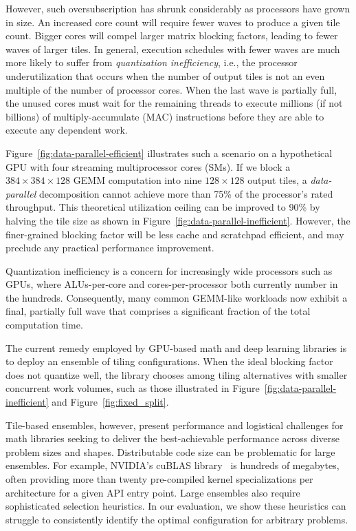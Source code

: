 However, such oversubscription has shrunk considerably as processors have grown in size.  An increased core count will require fewer waves to produce a given tile count.  Bigger cores will compel larger matrix blocking factors, leading to fewer waves of larger tiles.  In general, execution schedules with fewer waves are much more likely to suffer from \emph{quantization inefficiency}, i.e., the processor underutilization that occurs when the number of output tiles is not an even multiple of the number of processor cores.  When the last wave is partially full, the unused cores must wait for the remaining threads to execute millions (if not billions) of multiply-accumulate (MAC) instructions before they are able to execute any dependent work.

Figure~\ref{fig:data-parallel-efficient} illustrates such a scenario on a hypothetical GPU with four streaming multiprocessor cores (SMs). If we block a $384\times384\times128$ GEMM computation into nine
$128\times128$ output tiles, a \emph{data-parallel} decomposition cannot achieve more than 75\% of the processor's rated throughput.  This theoretical utilization ceiling can be improved to 90\% by halving the tile size as shown in Figure~\ref{fig:data-parallel-inefficient}.  However, the finer-grained blocking factor will be less cache and scratchpad efficient, and may preclude any practical performance improvement.

Quantization inefficiency is a concern for increasingly wide processors such as GPUs, where ALUs-per-core and cores-per-processor both currently number in the hundreds. Consequently, many common GEMM-like workloads now exhibit a final, partially full wave that comprises a significant fraction of the total computation time.

The current remedy employed by GPU-based math and deep learning libraries is to deploy an ensemble of tiling configurations.  When the ideal blocking factor does not quantize well, the library chooses among tiling alternatives with smaller concurrent work volumes, such as those illustrated in 
Figure~\ref{fig:data-parallel-inefficient} and Figure~\ref{fig:fixed_split}.

Tile-based ensembles, however, present performance and logistical challenges for math libraries seeking to deliver the best-achievable performance across diverse problem sizes and shapes.  Distributable code size can be problematic for large ensembles.  For example, NVIDIA's cuBLAS library~\cite{NVIDIA:2020:CUBLAS} is hundreds of megabytes, often providing more than twenty pre-compiled kernel specializations per architecture for a given API entry point.  Large ensembles also require sophisticated selection heuristics.  In our evaluation, we show these heuristics can struggle to consistently identify the optimal configuration for arbitrary problems.

